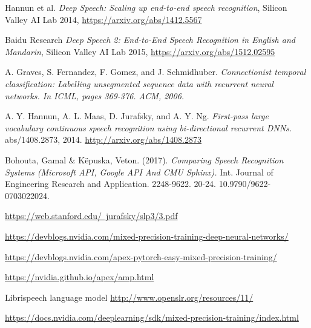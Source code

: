 \documentclass[licencjacka,en]{pracamgr}
\begin{document}
\begin{thebibliography}{99}

 Hannun et al.
\textit{Deep Speech: Scaling up end-to-end speech recognition}, Silicon Valley AI Lab 2014, \href{https://arxiv.org/abs/1412.5567}{https://arxiv.org/abs/1412.5567}

 Baidu Research \textit{Deep Speech 2: End-to-End Speech Recognition in English and Mandarin}, Silicon Valley AI Lab 2015, \href{https://arxiv.org/abs/1512.02595}{https://arxiv.org/abs/1512.02595}

 A. Graves, S. Fernandez, F. Gomez, and J. Schmidhuber. \textit{Connectionist temporal classification:
Labelling unsegmented sequence data with recurrent neural networks. In ICML, pages 369-376. ACM, 2006.}

 A. Y. Hannun, A. L. Maas, D. Jurafsky, and A. Y. Ng. \textit{First-pass large vocabulary continuous speech recognition using bi-directional recurrent DNNs.} abs/1408.2873, 2014. \href{http://arxiv.org/abs/1408.2873}{http://arxiv.org/abs/1408.2873}

 Bohouta, Gamal \& Këpuska, Veton. (2017). \textit{Comparing Speech Recognition Systems (Microsoft API, Google API And CMU Sphinx).} Int. Journal of Engineering Research and Application. 2248-9622. 20-24. 10.9790/9622-0703022024.

 \href{https://web.stanford.edu/~jurafsky/slp3/3.pdf}{https://web.stanford.edu/~jurafsky/slp3/3.pdf}

 \href{https://devblogs.nvidia.com/mixed-precision-training-deep-neural-networks/}
{https://devblogs.nvidia.com/mixed-precision-training-deep-neural-networks/}

 \href{https://devblogs.nvidia.com/apex-pytorch-easy-mixed-precision-training/}{https://devblogs.nvidia.com/apex-pytorch-easy-mixed-precision-training/}

 \href{https://nvidia.github.io/apex/amp.html}{https://nvidia.github.io/apex/amp.html}

 Librispeech language model
\href{http://www.openslr.org/resources/11/}{http://www.openslr.org/resources/11/}

 \href{https://docs.nvidia.com/deeplearning/sdk/mixed-precision-training/index.html}{https://docs.nvidia.com/deeplearning/sdk/mixed-precision-training/index.html}


\end{thebibliography}
\end{document}
